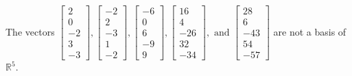 \begin{exercise}
\begin{exerciseStatement}
  \end{exerciseStatement}
  \begin{exerciseAnswer}
   The vectors \(\left[\begin{array}{r}
2 \\
0 \\
-2 \\
3 \\
-3
\end{array}\right] , \left[\begin{array}{r}
-2 \\
2 \\
-3 \\
1 \\
-2
\end{array}\right] , \left[\begin{array}{r}
-6 \\
0 \\
6 \\
-9 \\
9
\end{array}\right] , \left[\begin{array}{r}
16 \\
4 \\
-26 \\
32 \\
-34
\end{array}\right] , \text{ and } \left[\begin{array}{r}
28 \\
6 \\
-43 \\
54 \\
-57
\end{array}\right]\) 
  	 are not  a basis of \(\mathbb{R}^5\).
  


  \end{exerciseAnswer}
\end{exercise}